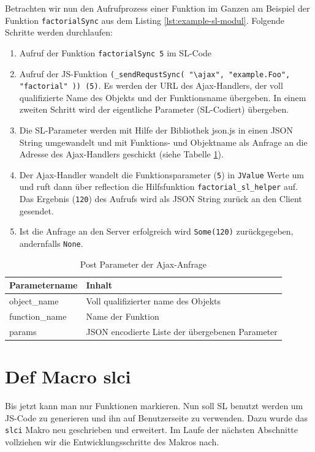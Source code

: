 \documentclass[12pt,bibtotoc]{scrreprt}
\begin{document}
Betrachten wir nun den Aufrufprozess einer Funktion im Ganzen am Beispiel der Funktion \lstinline!factorialSync! aus dem Listing \ref{lst:example-sl-modul}. Folgende Schritte werden durchlaufen:
\begin{enumerate}
 \item{Aufruf der Funktion \lstinline!factorialSync 5! im \ac{SL}-Code}
 \item{Aufruf der \ac{JS}-Funktion \lstinline!(_sendRequstSync( "\ajax", "example.Foo", "factorial" )) (5)!. Es werden der \ac{URL} des Ajax-Handlers, der voll qualifizierte Name des Objekts und der Funktionsname übergeben. In einem zweiten Schritt wird der eigentliche Parameter (\ac{SL}-Codiert) übergeben.}
 \item{Die \ac{SL}-Parameter werden mit Hilfe der Bibliothek json.js \cite{Crockford2010} in einen JSON String umgewandelt und mit Funktions- und Objektname als Anfrage an die Adresse des Ajax-Handlers geschickt (siehe Tabelle \ref{tab:post-parameter}).}
 \item{Der Ajax-Handler wandelt die Funktionsparameter (\lstinline!5!) in \lstinline!JValue! Werte um \cite{Json4s} und ruft dann über reflection die Hilfsfunktion \lstinline!factorial_sl_helper! auf. Das Ergebnis (\lstinline!120!) des Aufrufs wird als JSON String zurück an den Client gesendet.}
 \item{Ist die Anfrage an den Server erfolgreich wird \lstinline!Some(120)! zurückgegeben, andernfalls \lstinline!None!.}
\end{enumerate}

\begin{table}[h]
\caption{Post Parameter der Ajax-Anfrage}
\centering
\begin{tabular}{ll}
Parametername        &   Inhalt \\
\hline
object\_name   & Voll qualifizierter name des Objekts \\
function\_name & Name der Funktion\\
params         & JSON encodierte Liste der übergebenen Parameter\\
\end{tabular}
\label{tab:post-parameter}
\end{table}

\section{Def Macro slci}
\label{sec:inline-macro}

Bis jetzt kann man nur Funktionen markieren. Nun soll \ac{SL} benutzt werden um \ac{JS}-Code zu generieren und ihn auf Benutzerseite zu verwenden. Dazu wurde das \lstinline!slci! Makro neu geschrieben und erweitert. Im Laufe der nächsten Abschnitte vollziehen wir die Entwicklungsschritte des Makros nach.
\end{document}
